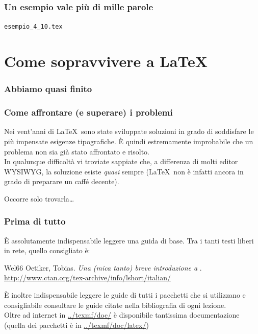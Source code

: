 \documentclass[svgnames,%
	ucs,%
	pdftex]{guitbeamer}
\begin{document}
\begin{frame}
  \frametitle{Un esempio vale pi\`u di mille parole}
	\begin{center}
		\alert{\texttt{esempio\_4\_10.tex}}
	\end{center}
\end{frame}
\section{Come sopravvivere a \LaTeX}
\begin{frame}
  \frametitle{Abbiamo quasi finito}
\end{frame}
\begin{frame}
  \frametitle{Come affrontare (e superare) i problemi}
	Nei vent'anni di \LaTeX\ sono state sviluppate soluzioni in grado di soddisfare le pi\`u impensate esigenze tipografiche. \`E quindi estremamente improbabile che un problema non sia gi\`a stato affrontato e risolto.\\
  \bigskip
	In qualunque difficolt\`a vi troviate sappiate che, a differenza di molti editor WYSIWYG, la soluzione esiste \emph{quasi} sempre (\LaTeX\ non \`e infatti ancora in grado di preparare un caff\'e decente). 
	\begin{center}
		Occorre solo trovarla\dots
	\end{center}
\end{frame}
\begin{frame}
	\frametitle{Prima di tutto}
	\`E assolutamente indispensabile leggere una guida di base. Tra i tanti testi liberi in rete, quello consigliato \`e:
	\begin{thebibliography}{Wel66}
		Oetiker, Tobias.
		\newblock \textit{Una (mica tanto) breve introduzione a \LaTeXe}.
		\newblock
		\small\url{http://www.ctan.org/tex-archive/info/lshort/italian/}
	\end{thebibliography}
  \smallskip
	\`E inoltre indispensabile leggere le guide di tutti i pacchetti che
	si utilizzano e consigliabile consultare le guide citate nella
	bibliografia di ogni lezione.\\
  \smallskip
	Oltre ad internet in \url{../texmf/doc/} \`e disponibile tantissima
	documentazione (quella dei pacchetti \`e in \url{../texmf/doc/latex/})
\end{frame}
\end{document}
